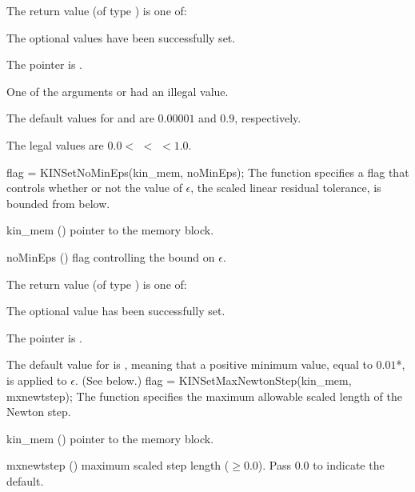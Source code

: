 {
  The return value  (of type ) is one of:
  \begin{args}
  \item[\Id{KIN\_SUCCESS}] 
    The optional values have been successfully set.
  \item[\Id{KIN\_MEM\_NULL}]
    The  pointer is .
  \item[\Id{KIN\_ILL\_INPUT}]
    One of the arguments  or  had an illegal value.
  \end{args}
}
{
  The default values for  and  are $0.00001$ and $0.9$,
  respectively.

  The legal values are $0.0 <$  $<$  $< 1.0$.
}
{
flag = KINSetNoMinEps(kin\_mem, noMinEps);
}
{
  The function  specifies a flag that controls whether or not
  the value of $\epsilon$, the scaled linear residual tolerance, is
  bounded from below.
}
{
  \begin{args}[noMinEps]
  \item[kin\_mem] ()
    pointer to the {\kinsol} memory block.
  \item[noMinEps] ()
    flag controlling the bound on $\epsilon$.
  \end{args}
}
{
  The return value  (of type ) is one of:
  \begin{args}
  \item[\Id{KIN\_SUCCESS}] 
    The optional value has been successfully set.
  \item[\Id{KIN\_MEM\_NULL}]
    The  pointer is .
  \end{args}
}
{
  The default value for  is , meaning that a
  positive minimum value, equal to $0.01$*, is applied to
  $\epsilon$.  (See  below.)
}
{
flag = KINSetMaxNewtonStep(kin\_mem, mxnewtstep);
}
{
  The function  specifies the maximum allowable scaled
  length of the Newton step.
}
{
  \begin{args}[mxnewtstep]
  \item[kin\_mem] ()
    pointer to the {\kinsol} memory block.
  \item[mxnewtstep] ()
    maximum scaled step length ($\geq 0.0$).  Pass $0.0$ to indicate the default.
  \end{args}
}
